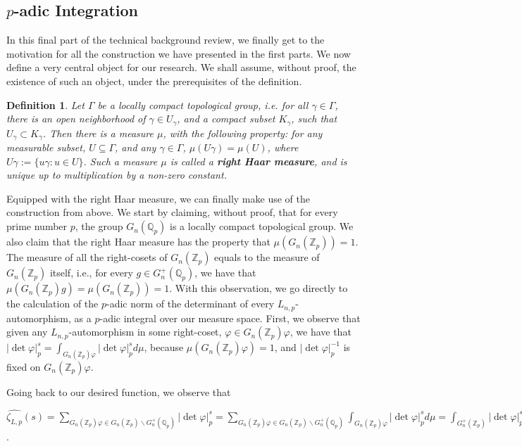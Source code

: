 \documentclass[12pt]{article}
\newtheorem{definition}[theorem]{Definition}
\begin{document}
\subsection{$p$-adic Integration}
In this final part of the technical background review, we finally get to the motivation for all the construction we have presented in the first parts. We now define a very central object for our research. We shall assume, without proof, the existence of such an object, under the prerequisites of the definition.
\begin{definition}
\label{def.right.haar.measure}
Let $\Gamma$ be a locally compact topological group, i.e. for all $\gamma\in\Gamma$, there is an open neighborhood of $\gamma\in U_{\gamma}$, and a compact subset $K_{\gamma}$, such that $U_{\gamma}\subset K_{\gamma}$. Then there is a measure $\mu$, with the following property: for any measurable subset, $U\subseteq\Gamma$, and any $\gamma\in\Gamma$, $\mu(U\gamma)=\mu(U)$, where $U\gamma:=\{u\gamma : u\in U\}$. Such a measure $\mu$ is called a \textbf{right Haar measure}, and is unique up to multiplication by a non-zero constant.
\end{definition}
Equipped with the right Haar measure, we can finally make use of the construction from above. We start by claiming, without proof, that for every prime number $p$, the group $G_n(\mathbb{Q}_p)$ is a locally compact topological group. We also claim that the right Haar measure has the property that $\mu(G_n(\mathbb{Z}_p))=1$. The measure of all the right-cosets of $G_n(\mathbb{Z}_p)$ equals to the measure of $G_n(\mathbb{Z}_p)$ itself, i.e., for every $g\in G^+_n(\mathbb{Q}_p)$, we have that $\mu(G_n(\mathbb{Z}_p)g)=\mu(G_n(\mathbb{Z}_p))=1$.
With this observation, we go directly to the calculation of the $p$-adic norm of the determinant of every $L_{n,p}$-automorphism, as a $p$-adic integral over our measure space.
First, we observe that given any $L_{n,p}$-automorphism in some right-coset, $\varphi\in G_n(\mathbb{Z}_p)\varphi$, we have that $|\det\varphi|_p^s=\displaystyle\int_{G_n(\mathbb{Z}_p)\varphi}|\det\varphi|_p^sd\mu$, because $\mu(G_n(\mathbb{Z}_p)\varphi)=1$, and $|\det\varphi|_p^{-1}$ is fixed on $G_n(\mathbb{Z}_p)\varphi$.\par
Going back to our desired function, we observe that\par $\hat{\zeta_{L,p}}(s)=\underset{\scriptscriptstyle G_n(\mathbb{Z}_p)\varphi\in G_n(\mathbb{Z}_p)\backslash G^+_n(\mathbb{Q}_p)}{\sum}|\det\varphi|_p^s=\underset{\scriptscriptstyle G_n(\mathbb{Z}_p)\varphi\in G_n(\mathbb{Z}_p)\backslash G^+_n(\mathbb{Q}_p)}{\sum}\displaystyle\int_{G_n(\mathbb{Z}_p)\varphi}|\det\varphi|_p^sd\mu=\displaystyle\int_{G^+_n(\mathbb{Z}_p)}|\det\varphi|_p^sd\mu$.\par 
\end{document}
